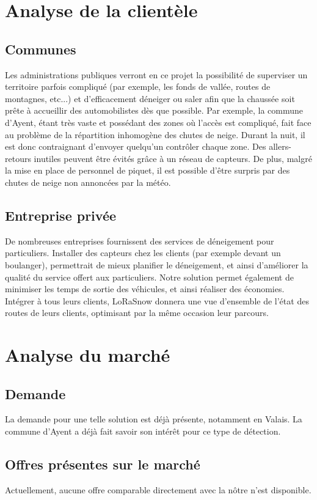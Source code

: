 \section{Analyse de la clientèle}
\subsection{Communes}
Les administrations publiques verront en ce projet la possibilité de superviser
un territoire parfois compliqué (par exemple, les fonds de vallée,
routes de montagnes, etc...) et d'efficacement déneiger ou saler
afin que la chaussée soit prête à accueillir des automobilistes dès que possible.
Par exemple, la commune d'Ayent, étant très vaste et possédant des zones
où l'accès est compliqué, fait face au problème de la répartition inhomogène
des chutes de neige. Durant la nuit, il est donc contraignant d'envoyer
quelqu'un contrôler chaque zone. Des allers-retours inutiles peuvent être
évités grâce à un réseau de capteurs.
De plus, malgré la mise en place de personnel de piquet, il est possible
d'être surpris par des chutes de neige non annoncées par la météo.

\subsection{Entreprise privée}
De nombreuses entreprises fournissent des services de déneigement pour particuliers.
Installer des capteurs chez les clients (par exemple devant un boulanger),
permettrait de mieux planifier le déneigement, et ainsi d'améliorer la qualité
du service offert aux particuliers.
Notre solution permet également de minimiser les temps de sortie des véhicules,
et ainsi réaliser des économies.
Intégrer à tous leurs clients, LoRaSnow donnera une vue d'ensemble de l'état
des routes de leurs clients, optimisant par la même occasion leur parcours.
\newpage

\section{Analyse du marché}
\subsection{Demande}
La demande pour une telle solution est déjà présente, notamment en Valais.
La commune d'Ayent a déjà fait savoir son intérêt pour ce type de détection.

\subsection{Offres présentes sur le marché}
Actuellement, aucune offre comparable directement avec la nôtre n'est disponible.

